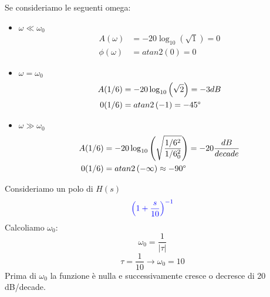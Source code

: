 \documentclass[a4paper]{article}
\begin{document}
\vspace{1em}
\noindent
Se consideriamo le seguenti omega:
\begin{itemize}
  \item \( \omega \ll \omega_0 \)
    \[
      \begin{aligned}
        A(\omega) &= -20 \log_{10} \left( \sqrt{1} \right) = 0\\
        \phi(\omega) &= atan2\left( 0 \right) = 0
      \end{aligned}
    \] 
    \item \( \omega = \omega_0 \) 
      \[
        \begin{aligned}
          A(1/6) &= -20 \log_{10} \left( \sqrt{2} \right) = -3dB\\
          0(1/6) &= atan2\left( -1 \right) = -45\degree
        \end{aligned}
      \] 

    \item \( \omega \gg \omega_0 \) 
      \[
        \begin{aligned}
          A(1/6) &= -20 \log_{10} \left( \sqrt{\frac{1/6^2}{1/6_0^2}} \right) =
          -20 \frac{dB}{decade}\\
          0(1/6) &= atan2\left( -\infty \right) \approx -90\degree
        \end{aligned}
      \]
\end{itemize}
Consideriamo un polo di \( H(s) \) 
\[
  \color{blue} \left( 1 + \frac{s}{10} \right)^{-1}
\] 
Calcoliamo \( \omega_0 \):
\[
  \omega_0 = \frac{1}{|\tau|}
\] 
\[
  \tau = \frac{1}{10} \to \omega_0 = 10
\] 
Prima di \( \omega_0 \) la funzione è nulla e successivamente cresce o decresce di
20 dB/decade.
\end{document}
